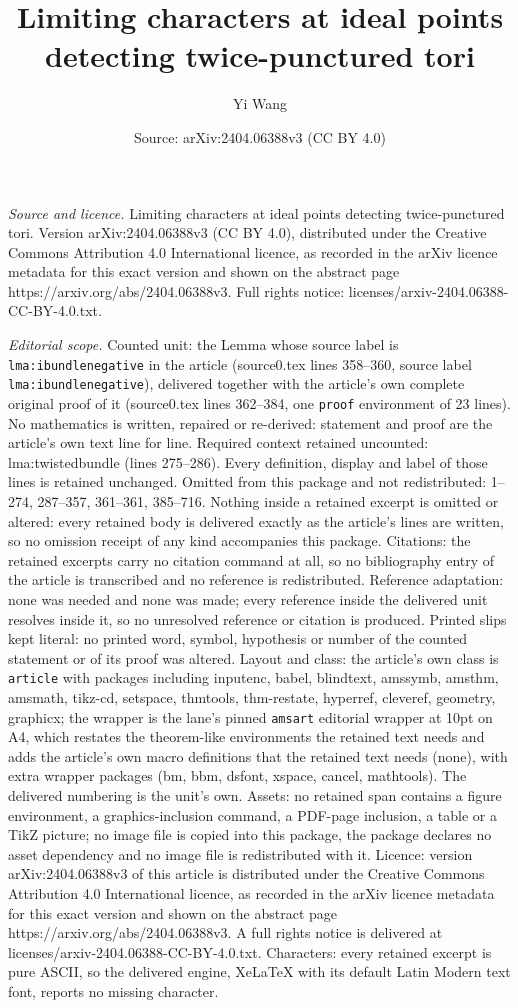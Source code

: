 \documentclass[10pt,a4paper]{amsart}
\title[Limiting characters at ideal points detecting twice-puncture]{Limiting characters at ideal points detecting twice-punctured tori}
\author{Yi Wang}
\date{Source: arXiv:2404.06388v3 (CC BY 4.0)}
\begin{document}
\maketitle

\noindent\emph{Source and licence.} Limiting characters at ideal points detecting twice-punctured tori. Version arXiv:2404.06388v3 (CC BY 4.0), distributed under the Creative Commons Attribution 4.0 International licence, as recorded in the arXiv licence metadata for this exact version and shown on the abstract page https://arxiv.org/abs/2404.06388v3. Full rights notice: licenses/arxiv-2404.06388-CC-BY-4.0.txt.\par\smallskip

\noindent\textit{Editorial scope.} Counted unit: the Lemma whose source label is \texttt{lma:ibundlenegative} in the article (source0.tex lines 358--360, source label \texttt{lma:ibundlenegative}), delivered together with the article's own complete original proof of it (source0.tex lines 362--384, one \texttt{proof} environment of 23 lines). No mathematics is written, repaired or re-derived: statement and proof are the article's own text line for line. Required context retained uncounted: lma:twistedbundle (lines 275--286). Every definition, display and label of those lines is retained unchanged. Omitted from this package and not redistributed: 1--274, 287--357, 361--361, 385--716. Nothing inside a retained excerpt is omitted or altered: every retained body is delivered exactly as the article's lines are written, so no omission receipt of any kind accompanies this package. Citations: the retained excerpts carry no citation command at all, so no bibliography entry of the article is transcribed and no reference is redistributed. Reference adaptation: none was needed and none was made; every reference inside the delivered unit resolves inside it, so no unresolved reference or citation is produced. Printed slips kept literal: no printed word, symbol, hypothesis or number of the counted statement or of its proof was altered. Layout and class: the article's own class is \texttt{article} with packages including inputenc, babel, blindtext, amssymb, amsthm, amsmath, tikz-cd, setspace, thmtools, thm-restate, hyperref, cleveref, geometry, graphicx; the wrapper is the lane's pinned \texttt{amsart} editorial wrapper at 10pt on A4, which restates the theorem-like environments the retained text needs and adds the article's own macro definitions that the retained text needs (none), with extra wrapper packages (bm, bbm, dsfont, xspace, cancel, mathtools). The delivered numbering is the unit's own. Assets: no retained span contains a figure environment, a graphics-inclusion command, a PDF-page inclusion, a table or a TikZ picture; no image file is copied into this package, the package declares no asset dependency and no image file is redistributed with it. Licence: version arXiv:2404.06388v3 of this article is distributed under the Creative Commons Attribution 4.0 International licence, as recorded in the arXiv licence metadata for this exact version and shown on the abstract page https://arxiv.org/abs/2404.06388v3. A full rights notice is delivered at licenses/arxiv-2404.06388-CC-BY-4.0.txt. Characters: every retained excerpt is pure ASCII, so the delivered engine, XeLaTeX with its default Latin Modern text font, reports no missing character.
\end{document}
